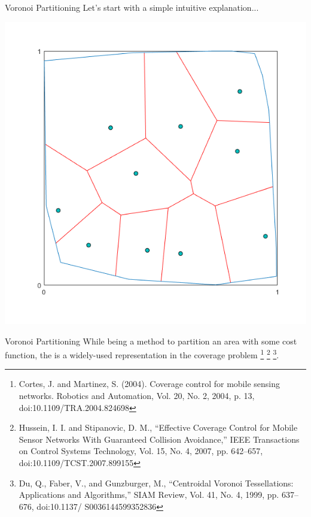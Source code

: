 \documentclass[t]{beamer}
\begin{document}
\subsection[Voronoi Partitioning]{}
\begin{frame}[label=vorpart1]{Voronoi Partitioning}
Let's start with a simple intuitive explanation...
\begin{center}
\includegraphics[scale=0.4]{Voronoi-example.png}
\end{center}
\end{frame}

\begin{frame}[label=vorpart2]{Voronoi Partitioning}
While being a method to partition an area with some cost function, the is a widely-used representation in the coverage problem \footnote{Cortes, J. and Martinez, S. (2004). Coverage control for mobile sensing networks. Robotics and Automation, Vol. 20, No. 2, 2004, p. 13, doi:10.1109/TRA.2004.824698} \footnote{Hussein, I. I. and Stipanovic, D. M., “Effective Coverage Control for Mobile Sensor Networks
With Guaranteed Collision Avoidance,” IEEE Transactions on Control Systems
Technology, Vol. 15, No. 4, 2007, pp. 642–657, doi:10.1109/TCST.2007.899155} \footnote{Du, Q., Faber, V., and Gunzburger, M., “Centroidal Voronoi Tessellations: Applications
and Algorithms,” SIAM Review, Vol. 41, No. 4, 1999, pp. 637–676, doi:10.1137/
S0036144599352836}.
\end{frame}
\end{document}
